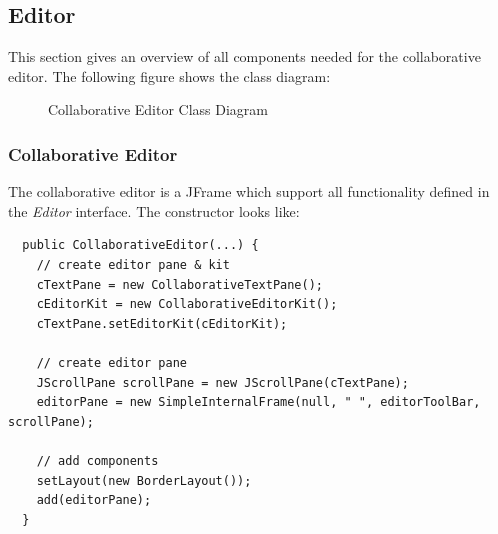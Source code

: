 \subsection{Editor}
This section gives an overview of all components needed for the collaborative editor. The following figure shows the class diagram:
\begin{figure}[H]
\begin{center} 
\caption{Collaborative Editor Class Diagram}
\label{default}
\end{center}
\end{figure}

\subsubsection{Collaborative Editor}
The collaborative editor is a JFrame which support all functionality defined in the \textit{Editor} interface. The constructor looks like:
\begin{verbatim}
  public CollaborativeEditor(...) {
    // create editor pane & kit
    cTextPane = new CollaborativeTextPane();
    cEditorKit = new CollaborativeEditorKit();
    cTextPane.setEditorKit(cEditorKit);

    // create editor pane
    JScrollPane scrollPane = new JScrollPane(cTextPane);
    editorPane = new SimpleInternalFrame(null, " ", editorToolBar, scrollPane);

    // add components		
    setLayout(new BorderLayout());
    add(editorPane);    
  }
\end{verbatim}

